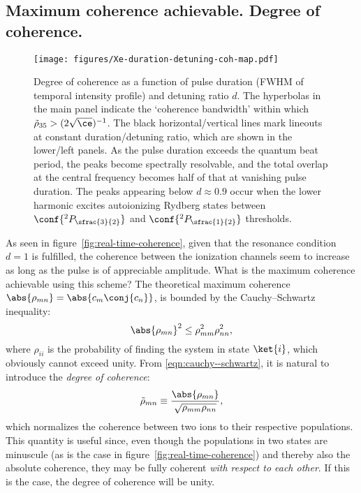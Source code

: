 \subsection{Maximum coherence achievable. Degree of coherence.}
\label{sec:maximum-coherence}
\begin{figure}[tb]
  \centering
  \texttt{[image: figures/Xe-duration-detuning-coh-map.pdf]}
  \caption{\label{fig:duration-detuning-map} Degree of coherence as a
    function of pulse duration (FWHM of temporal intensity profile)
    and detuning ratio \(d\). The hyperbolas in the main panel
    indicate the `coherence bandwidth' within which
    \(\tilde{\rho}_{35}>(2\sqrt{\ce})^{-1}\). The black
    horizontal/vertical lines mark lineouts at constant
    duration/detuning ratio, which are shown in the lower/left panels.
    As the pulse duration exceeds the quantum beat period, the peaks
    become spectrally resolvable, and the total overlap at the central
    frequency becomes half of that at vanishing pulse duration. The
    peaks appearing below \(d\approx0.9\) occur when the lower harmonic
    excites autoionizing Rydberg states between
    \(\conf{^2P_{\sfrac{3}{2}}}\) and \(\conf{^2P_{\sfrac{1}{2}}}\)
    thresholds.}
\end{figure}
As seen in figure~\ref{fig:real-time-coherence}, given that the
resonance condition \(d=1\) is fulfilled, the coherence between the
ionization channels seem to increase as long as the pulse is of
appreciable amplitude. What is the maximum coherence achievable using
this scheme? The theoretical maximum coherence
\(\abs{\rho_{mn}}=\abs{c_m\conj{c_n}}\), is bounded by the
Cauchy--Schwartz inequality:
\begin{equation}
  \label{eqn:cauchy--schwartz}
  \abs{\rho_{mn}}^2 \leq \rho_{mm}^2\rho_{nn}^2,
\end{equation}
where \(\rho_{ii}\) is the probability of finding the system in state
\(\ket{i}\), which obviously cannot exceed unity. From
\eqref{eqn:cauchy--schwartz}, it is natural to introduce the
\emph{degree of coherence}:
\begin{equation}
  \label{eqn:degree-of-coherence}
  \tilde{\rho}_{mn} \equiv \frac{\abs{\rho_{mn}}}{\sqrt{{\rho_{mm}}{\rho_{nn}}}},
\end{equation}
which normalizes the coherence between two ions to their respective
populations. This quantity is useful since, even though the
populations in two states are minuscule (as is the case in
figure~\ref{fig:real-time-coherence}) and thereby also the absolute
coherence, they may be fully coherent \emph{with respect to each
  other}. If this is the case, the degree of coherence will be
unity.


